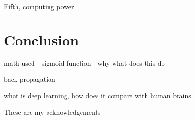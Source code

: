 \documentclass[sigconf]{acmart}
\begin{document}
Fifth, computing power

\section{Conclusion}

math used - sigmoid function - why what does this do

back propagation

what is deep learning, how does it compare with human brains

 
\begin{acks}

 These are my acknowledgements

\end{acks}



 


\appendix
 


\end{document}
